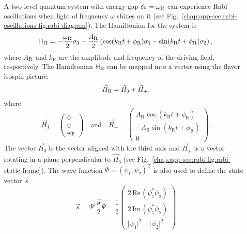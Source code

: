 A two-level quantum system with energy gap $\delta\varepsilon = \omega_{\mathrm R}$ can experience Rabi oscillations when light of frequency $\omega$ shines on it (see Fig.~\ref{chap:app-sec:rabi-oscillations-fig:rabi-diagram}).
The Hamiltonian for the system is
\begin{equation}
    \mathsf H_{\RR} = -\frac{\omega_{\RR}}{2}\sigma_3 - \frac{A_{\RR} }{2}  \left( \cos(k_{\RR} t +\phi_{\RR})\sigma_1  - \sin(k_{\RR} t +\phi_{\RR}) \sigma_2\right),
    \label{rabi-oscillation-single-perturbation}
\end{equation}
where $A_{\mathrm R}$ and $k_{\mathrm{R}}$ are the amplitude and frequency of the driving field, respectively. The Hamiltonian $\mathsf H_\mathrm R$ can be mapped into a vector using the flavor isospin picture:
\begin{equation*}
\vec H_{\RR} = \vec H_3 + \vec H_+,
\label{chap:matter-eqn:rabi-hamiltonian-h3-hplus}
\end{equation*}
where
\begin{equation}
    \vec{H}_3 =  \begin{pmatrix}
    0 \\ 0 \\ \omega_{\mathrm R}
    \end{pmatrix} \quad \text{and} \quad
    \vec{H}_+ =  \begin{pmatrix}
    A_{\mathrm{R}} \cos(k_{\mathrm{R}} t +\phi_{\mathrm{R}}) \\
    - A_{\mathrm{R}} \sin(k_{\mathrm{R}} t +\phi_{\mathrm{R}}) \\
    0
    \end{pmatrix}.
    \label{chap:app-sec:rabi-eqn:h3-and-hplus}
\end{equation}
The vector $\vec{H}_3$ is the vector aligned with the third axis and $\vec{H}_+$ is a vector rotating in a plane perpendicular to $\vec{H}_3$ (see Fig.~\ref{chap:app-sec:rabi-fig:rabi-static-frame}). The wave function $\Psi=(\psi_1,\psi_2)^{\mathrm{T}}$ is also used to define the state vector $\vec{s}$
\begin{equation}
    \vec{s} = \Psi^\dagger \frac{\vec{\sigma}}{2}\Psi
    = \frac{1}{2}\begin{pmatrix}
    2\,\mathrm{Re}\,(\psi_1^* \psi_2) \\
    2\,\mathrm{Im}\,(\psi_1^*\psi_2) \\
    \lvert \psi_1 \rvert^2 - \lvert \psi_2 \rvert^2
    \end{pmatrix}
\end{equation}



